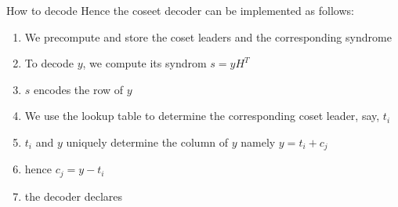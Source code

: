 \begin{parag}{How to decode}
    Hence the coseet decoder can be implemented as follows:
    \begin{enumerate}
        \item We precompute and store the coset leaders and the corresponding syndrome
        \item To decode $y$, we compute its syndrom $s = yH^T$
        \item $s$ encodes the row of $y$
        \item We use the lookup table to determine the corresponding coset leader, say, $t_i$
        \item $t_i$ and $y$ uniquely determine the column of $y$ namely $y =  t_i + c_j$
           \item hence $c_j =  y - t_i$
           \item the decoder  declares
    \end{enumerate}
    
\end{parag}


